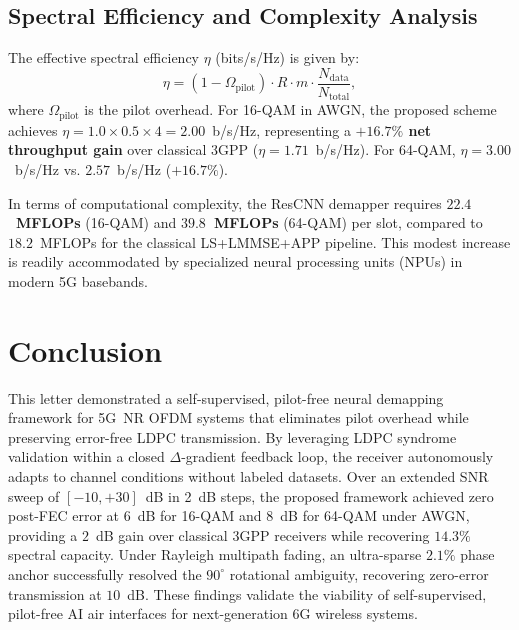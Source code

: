 ﻿\documentclass[journal,twoside]{IEEEtran}
\begin{document}
\subsection{Spectral Efficiency and Complexity Analysis}

The effective spectral efficiency $\eta$ (bits/s/Hz) is given by:
\begin{equation}
  \eta = (1 - \Omega_{\text{pilot}}) \cdot R \cdot m \cdot \frac{N_{\text{data}}}{N_{\text{total}}},
\end{equation}
where $\Omega_{\text{pilot}}$ is the pilot overhead.
For 16-QAM in AWGN, the proposed scheme achieves $\eta = 1.0 \times 0.5 \times 4 = 2.00$~b/s/Hz,
representing a \textbf{$+16.7\%$ net throughput gain} over classical 3GPP ($\eta = 1.71$~b/s/Hz).
For 64-QAM, $\eta = 3.00$~b/s/Hz vs. $2.57$~b/s/Hz (\textbf{$+16.7\%$}).

In terms of computational complexity, the ResCNN demapper requires \textbf{$22.4$~MFLOPs} (16-QAM) and
\textbf{$39.8$~MFLOPs} (64-QAM) per slot, compared to $18.2$~MFLOPs for the classical LS+LMMSE+APP pipeline.
This modest increase is readily accommodated by specialized neural processing units (NPUs) in
modern 5G basebands.

\section{Conclusion}\label{sec:conclusion}

This letter demonstrated a self-supervised, pilot-free neural demapping framework
for 5G~NR OFDM systems that eliminates pilot overhead while preserving error-free
LDPC transmission.
By leveraging LDPC syndrome validation within a closed $\Delta$-gradient feedback loop,
the receiver autonomously adapts to channel conditions without labeled datasets.
Over an extended SNR sweep of $[-10, +30]$~dB in 2~dB steps, the proposed framework
achieved zero post-FEC error at $6$~dB for 16-QAM and $8$~dB for 64-QAM under AWGN,
providing a $2$~dB gain over classical 3GPP receivers while recovering $14.3\%$
spectral capacity.
Under Rayleigh multipath fading, an ultra-sparse $2.1\%$ phase anchor successfully
resolved the $90^\circ$ rotational ambiguity, recovering zero-error transmission at $10$~dB.
These findings validate the viability of self-supervised, pilot-free AI air interfaces
for next-generation 6G wireless systems.
\end{document}
